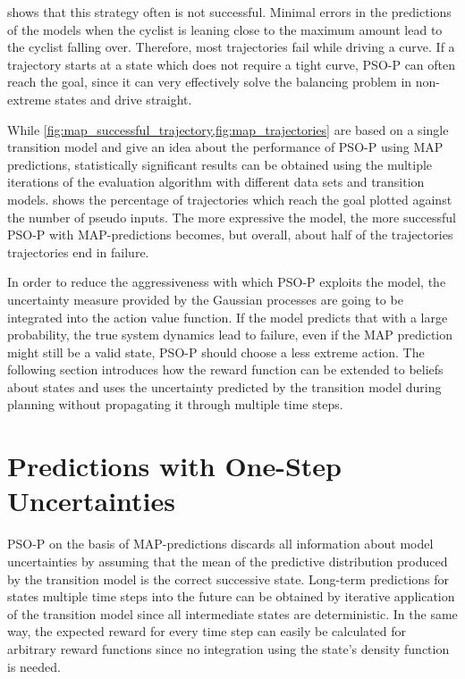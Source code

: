 shows that this strategy often is not successful.
Minimal errors in the predictions of the models when the cyclist is leaning close to the maximum amount lead to the cyclist falling over.
Therefore, most trajectories fail while driving a curve.
If a trajectory starts at a state which does not require a tight curve, PSO-P can often reach the goal, since it can very effectively solve the balancing problem in non-extreme states and drive straight.

While \cref{fig:map_successful_trajectory,fig:map_trajectories} are based on a single transition model and give an idea about the performance of PSO-P using MAP predictions, statistically significant results can be obtained using the multiple iterations of the evaluation algorithm with different data sets and transition models.
 shows the percentage of trajectories which reach the goal plotted against the number of pseudo inputs.
The more expressive the model, the more successful PSO-P with MAP-predictions becomes, but overall, about half of the trajectories trajectories end in failure.

In order to reduce the aggressiveness with which PSO-P exploits the model, the uncertainty measure provided by the Gaussian processes are going to be integrated into the action value function.
If the model predicts that with a large probability, the true system dynamics lead to failure, even if the MAP prediction might still be a valid state, PSO-P should choose a less extreme action.
The following section introduces how the reward function can be extended to beliefs about states and uses the uncertainty predicted by the transition model during planning without propagating it through multiple time steps.

\section{Predictions with One-Step Uncertainties}
PSO-P on the basis of MAP-predictions discards all information about model uncertainties by assuming that the mean of the predictive distribution produced by the transition model is the correct successive state.
Long-term predictions for states multiple time steps into the future can be obtained by iterative application of the transition model since all intermediate states are deterministic.
In the same way, the expected reward for every time step can easily be calculated for arbitrary reward functions since no integration using the state's density function is needed.

